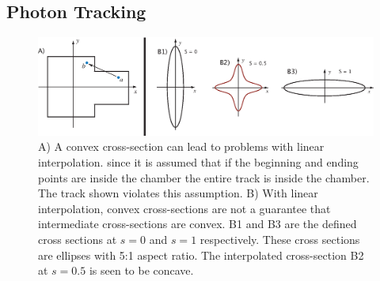 \documentclass[11pt]{article}
\begin{document}
\subsection{Photon Tracking}
\label{s:track}

\begin{figure}[tb]
\begin{center}
\includegraphics[width=6in]{chamber-problem.eps}
\caption{A) A convex cross-section can lead to problems with linear interpolation.
since it is assumed that if the beginning and ending points are inside the chamber 
the entire track is inside the chamber. The track shown violates this assumption.
B) With linear interpolation, convex cross-sections are not a guarantee that 
intermediate cross-sections are convex. B1 and B3 are the defined cross sections 
at $s = 0$ and $s = 1$ respectively. These cross sections are ellipses with 5:1 
aspect ratio. The interpolated cross-section B2 at $s = 0.5$ is seen to be concave.}
\label{f:convex-chamber}
\end{center}
\end{figure}
\end{document}
